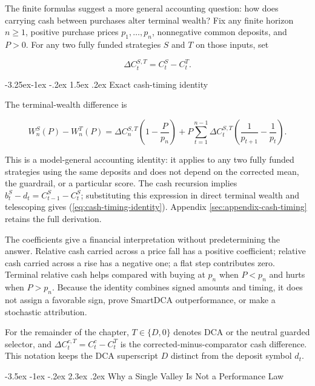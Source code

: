 \documentclass[12pt,a4paper,oneside]{report}
\makeatletter
\renewcommand\section{\@startsection{section}{1}{\z@}%
  {-3.5ex \@plus -1ex \@minus -.2ex}%
  {2.3ex \@plus .2ex}%
  {\normalfont\fontsize{14}{17}\selectfont\bfseries}}
\renewcommand\subsection{\@startsection{subsection}{2}{\z@}%
  {-3.25ex\@plus -1ex \@minus -.2ex}%
  {1.5ex \@plus .2ex}%
  {\normalfont\fontsize{12}{15}\selectfont\bfseries}}
\makeatother
\begin{document}
The finite formulas suggest a more general accounting question: how does
carrying cash between purchases alter terminal wealth? Fix any finite horizon
$n\geq1$, positive purchase prices $p_1,\ldots,p_n$, nonnegative common
deposits, and $P>0$. For any two fully funded strategies $S$ and $T$ on those
inputs, set

\begin{equation}
  \Delta C_t^{S,T}=C_t^S-C_t^T.
  \label{eq:cash-path-difference}
\end{equation}

\subsection{Exact cash-timing identity}
\label{thm:cash-timing}

The terminal-wealth difference is

\begin{equation}
  \boxed{
  W_n^S(P)-W_n^T(P)
  =\Delta C_n^{S,T}\left(1-\frac{P}{p_n}\right)
  +P\sum_{t=1}^{n-1}\Delta C_t^{S,T}
       \left(\frac1{p_{t+1}}-\frac1{p_t}\right).}
  \label{eq:cash-timing-identity}
\end{equation}

This is a model-general accounting identity: it applies to any two fully
funded strategies using the same deposits and does not depend on the corrected
mean, the guardrail, or a particular score. The cash recursion implies
$b_t^S-d_t=C_{t-1}^S-C_t^S$; substituting this expression in direct terminal
wealth and telescoping gives (\ref{eq:cash-timing-identity}). Appendix
\ref{sec:appendix-cash-timing} retains the full derivation.

The coefficients give a financial interpretation without predetermining the
answer. Relative cash carried across a price fall has a positive coefficient;
relative cash carried across a rise has a negative one; a flat step contributes
zero. Terminal relative cash helps compared with buying at $p_n$ when $P<p_n$
and hurts when $P>p_n$. Because the identity combines signed amounts and
timing, it does not assign a favorable sign, prove SmartDCA outperformance, or
make a stochastic attribution.

For the remainder of the chapter, $T\in\{D,0\}$ denotes DCA or the neutral
guarded selector, and
$\Delta C_t^{c,T}=C_t^c-C_t^T$ is the corrected-minus-comparator cash
difference. This notation keeps the DCA superscript $D$ distinct from the
deposit symbol $d_t$.

\section{Why a Single Valley Is Not a Performance Law}
\label{sec:single-valley-limit}
\end{document}
